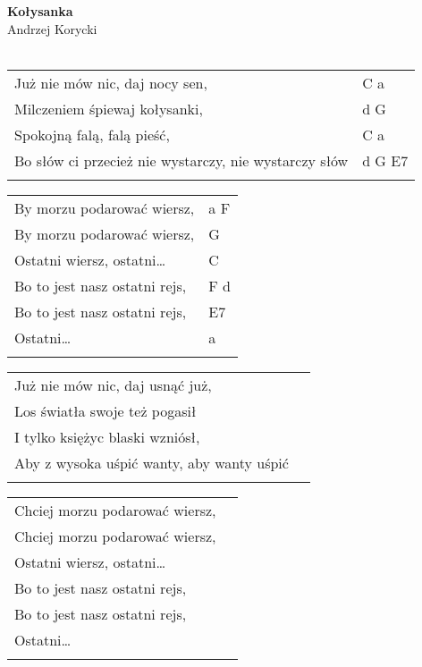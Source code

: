 \documentclass[a5paper]{article}
\begin{document}


\noindent
\fontsize{12pt}{15pt}\selectfont
\textbf{Kołysanka} \\
\fontsize{8pt}{10pt}\selectfont
Andrzej Korycki \\ \\
\fontsize{10pt}{12pt}\selectfont
{}
\begin{tabular}{@{}p{9.00cm}p{3cm}@{}}
\noindent
Już nie mów nic, daj nocy sen, & C a \\
Milczeniem śpiewaj kołysanki, & d G \\
Spokojną falą, falą pieść, & C a \\
Bo słów ci przecież nie wystarczy, nie wystarczy słów & d G E7 \\ \\
\end{tabular}

\noindent
\begin{tabular}{@{}p{8.00cm}p{3cm}@{}}
	By morzu podarować wiersz, & a F \\
	By morzu podarować wiersz, & G \\
	Ostatni wiersz, ostatni… & C \\
	Bo to jest nasz ostatni rejs, & F d \\
	Bo to jest nasz ostatni rejs, & E7 \\
	Ostatni… & a \\ \\
\end{tabular}

\noindent
\begin{tabular}{@{}p{8.00cm}p{3cm}@{}}
Już nie mów nic, daj usnąć już,	\\
Los światła swoje też pogasił \\
I tylko księżyc blaski wzniósł,	\\
Aby z wysoka uśpić wanty, aby wanty uśpić\\ \\
\end{tabular}

\noindent
\begin{tabular}{@{}p{8.00cm}p{3cm}@{}}
Chciej morzu podarować wiersz, \\
Chciej morzu podarować wiersz, \\
Ostatni wiersz, ostatni… \\
Bo to jest nasz ostatni rejs, \\
Bo to jest nasz ostatni rejs, \\
Ostatni… \\ \\
\end{tabular}
\end{document}
